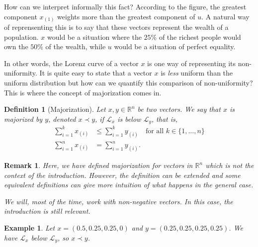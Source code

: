 \documentclass[a4paper]{article}
\newcommand*{\R}{\mathbb{R}}
\newtheorem{definition}{Definition}
\newtheorem{remark}{Remark}
\newtheorem{example}{Example}
\begin{document}
How can we interpret informally this fact? According to the figure, the greatest component \(x_(1)\) weights more than the greatest 
component of \(u\). A natural way of reprensenting this is to say that these vectors 
represent the wealth of a population. \(x\) would be a situation where the \(25\)\% of the richest 
people would own the \(50\)\% of the wealth, while \(u\) would be a situation of perfect equality.
\begin{figure}
    \centering
    \label{fig:lorenzwealth}
\end{figure}
In other words, the Lorenz curve of a vector \(x\) is one way of representing its non-uniformity.
It is quite easy to state that a vector \(x\) is \textit{less} uniform than the uniform distribution
but how can we quantify this comparison of non-uniformity? This is where the concept of majorization comes in.
\begin{definition}[Majorization] Let \(x,y\in\R^n\) be two vectors. We say that \(x\) is majorized by \(y\), 
    denoted \(x\prec y\), if \(\mathcal{L}_x\) is below \(\mathcal{L}_y\), that is, 
    \begin{align}
        \sum_{i=1}^k x_{(i)} &\leq \sum_{i=1}^k y_{(i)} \quad \text{for all } k\in\{1,\ldots,n\}\\
        \sum_{i=1}^n x_{(i)} &= \sum_{i=1}^n y_{(i)}.
    \end{align}
\end{definition}
\begin{remark} Here, we have defined majorization for vectors in \(\R^n\) which is not 
    the context of the introduction. However, the definition can be extended and some equivalent 
    definitions can give more intuition of what happens in the general case.

    We will, most of the time, work with non-negative vectors. In this case, the introduction 
    is still relevant.
\end{remark}
\begin{example} Let \(x = (0.5,0.25,0.25,0)\) and \(y = (0.25,0.25,0.25,0.25)\). We have 
    \(\mathcal{L}_x\) below \(\mathcal{L}_y\), so \(x\prec y\).
\end{example}
\end{document}
